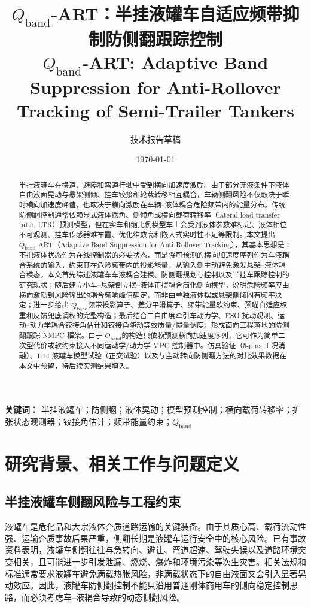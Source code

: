 \documentclass[UTF8,zihao=-4]{ctexrep}
\title{\texorpdfstring{$Q_{\mathrm{band}}$}{Qband}-ART：半挂液罐车自适应频带抑制防侧翻跟踪控制\\
\large \texorpdfstring{$Q_{\mathrm{band}}$}{Qband}-ART: Adaptive Band Suppression for Anti-Rollover Tracking of Semi-Trailer Tankers}
\author{技术报告草稿}
\date{\today}
\newcommand{\Qband}{$Q_{\mathrm{band}}$}
\begin{document}
\maketitle


\begin{abstract}
半挂液罐车在换道、避障和弯道行驶中受到横向加速度激励。由于部分充液条件下液体自由液面晃动与悬架侧倾、挂车铰接和轮载转移相互耦合，车辆侧翻风险不仅取决于瞬时横向加速度峰值，也取决于横向激励在车辆--液体耦合危险频带内的能量分布。传统防侧翻控制通常依赖显式液体摆角、侧倾角或横向载荷转移率（lateral load transfer ratio, LTR）预测模型，但在实车和缩比例模型车上会受到液体参数难标定、液体相位不可观测、挂车传感器难布置、优化维数高和嵌入式实时性不足等限制。本文提出 \Qband-ART（Adaptive Band Suppression for Anti-Rollover Tracking），其基本思想是：不把液体状态作为在线控制器的必要状态，而是将可预测的横向加速度序列作为车液耦合系统的输入，约束其在危险频带内的投影能量，从输入侧主动避免激发悬架--液体耦合模态。本文首先综述液罐车车液耦合建模、防侧翻规划与控制以及半挂车跟踪控制的研究现状；随后建立小车--悬架倒立摆--液体正摆耦合简化侧向模型，说明危险频率应由横向激励到风险输出的耦合频响峰值确定，而非由单独液体摆或悬架侧倾固有频率决定；进一步给出 \Qband 频带投影算子、差分平滑算子、频带能量软约束、预瞄自适应权重和反馈兜底调权的完整构造；最后结合二自由度牵引车动力学、ESO 扰动观测、运动--动力学耦合铰接角估计和铰接角随动等效质量/惯量调度，形成面向工程落地的防侧翻跟踪 NMPC 框架。由于 \Qband 的构造只依赖预测横向加速度序列，它可作为简单二次型代价或软约束接入不同运动学/动力学 MPC 控制器中。仿真验证（5-pins 工况消融）、1:14 液罐车模型试验（正交试验）以及与主动转向防侧翻方法的对比效果数据在本文中预留，待后续实测结果填入。
\end{abstract}

\noindent\textbf{关键词：} 半挂液罐车；防侧翻；液体晃动；模型预测控制；横向载荷转移率；扩张状态观测器；铰接角估计；频带能量约束；\Qband

\tableofcontents

\chapter{研究背景、相关工作与问题定义}

\section{半挂液罐车侧翻风险与工程约束}
液罐车是危化品和大宗液体介质道路运输的关键装备。由于其质心高、载荷流动性强、运输介质事故后果严重，侧翻长期是液罐车运行安全中的核心风险。已有事故资料表明，液罐车侧翻往往与急转向、避让、弯道超速、驾驶失误以及道路环境突变相关，且可能进一步引发泄漏、燃烧、爆炸和环境污染等次生灾害\cite{chengshuo2023,lijian2014,chenxiaoyong2023,wangyang2023,authority_tank_truck2022,wenling_accident2022}。相关法规和标准通常要求液罐车避免满载热胀风险，非满载状态下的自由液面又会引入显著晃动效应\cite{GB18564-1,TSGR0005-2011}。因此，液罐车防侧翻控制不能只沿用普通刚体商用车的侧向稳定控制思路，而必须考虑车--液耦合导致的动态侧翻风险。
\end{document}
